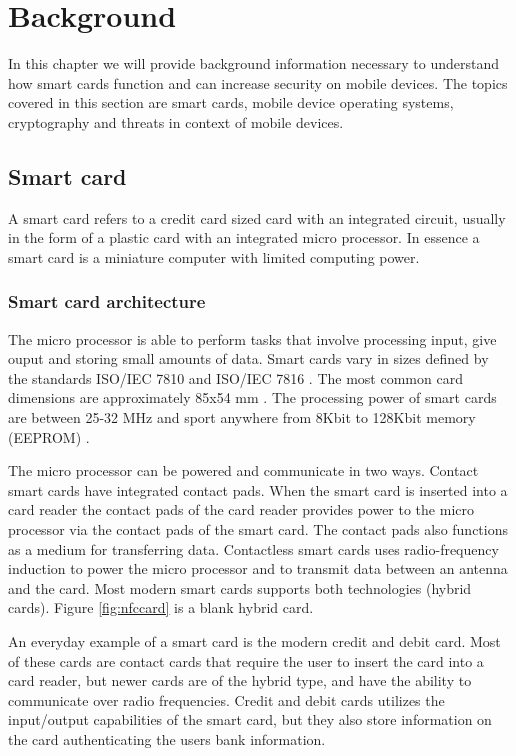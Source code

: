 \chapter{Background}
In this chapter we will provide background information necessary to understand how smart cards function and can increase security on mobile devices. The topics covered in this section are smart cards, mobile device operating systems, cryptography and threats in context of mobile devices.

\section{Smart card}
\label{sec:smartcard}
A smart card refers to a credit card sized card with an integrated circuit, usually in the form of a plastic card with an integrated micro processor. In essence a smart card is a miniature computer with limited computing power.

\subsection{Smart card architecture}
The micro processor is able to perform tasks that involve processing input, give ouput and storing small amounts of data. Smart cards vary in sizes defined by the standards ISO/IEC 7810 \cite{iso7810} and ISO/IEC 7816 \cite{iso7816}. The most common card dimensions are approximately 85x54 mm \cite[~Ch. 3.1]{smartcardHandbook}. The processing power of smart cards are between 25-32 MHz and sport anywhere from 8Kbit to 128Kbit memory (EEPROM) \cite{cardProcessing}.

The micro processor can be powered and communicate in two ways. Contact smart cards have integrated contact pads. When the smart card is inserted into a card reader the contact pads of the card reader provides power to the micro processor via the contact pads of the smart card. The contact pads also functions as a medium for transferring data. Contactless smart cards uses radio-frequency induction to power the micro processor and to transmit data between an antenna and the card. Most modern smart cards supports both technologies (hybrid cards). Figure \ref{fig:nfccard} is a blank hybrid card.

An everyday example of a smart card is the modern credit and debit card. Most of these cards are contact cards that require the user to insert the card into a card reader, but newer cards are of the hybrid type, and have the ability to communicate over radio frequencies. Credit and debit cards utilizes the input/output capabilities of the smart card, but they also store information on the card authenticating the users bank information.

